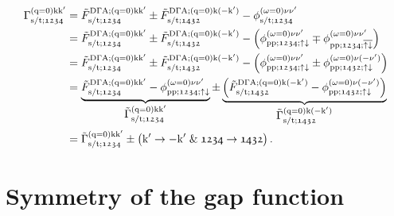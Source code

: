 \documentclass[main.tex]{subfiles}
\begin{document}
\begin{align}
\begin{split}
	\Gamma_{\text{s}/\text{t};\mathfrak{1234}}^{(\text{q}=0)\text{k}\text{k}'}&=\tilde{F}_{\text{s}/\text{t};\mathfrak{1234}}^{\text{D}\Gamma\text{A};(\text{q}=0)\text{k}\text{k}'}\pm \tilde{F}_{\text{s}/\text{t};\mathfrak{1432}}^{\text{D}\Gamma\text{A};(\text{q}=0)\text{k}(-\text{k}')}-\phi_{\text{s}/\text{t};\mathfrak{1234}}^{(\omega=0)\nu\nu'}\\
	&=\tilde{F}_{\text{s}/\text{t};\mathfrak{1234}}^{\text{D}\Gamma\text{A};(\text{q}=0)\text{k}\text{k}'}\pm \tilde{F}_{\text{s}/\text{t};\mathfrak{1432}}^{\text{D}\Gamma\text{A};(\text{q}=0)\text{k}(-\text{k}')}-\left (\phi_{\text{pp};\mathfrak{1234};\uparrow\downarrow}^{(\omega=0)\nu\nu'}\mp \phi_{\text{pp};\mathfrak{1234};\overline{\uparrow\downarrow}}^{(\omega=0)\nu\nu'}\right )\\
	&=\tilde{F}_{\text{s}/\text{t};\mathfrak{1234}}^{\text{D}\Gamma\text{A};(\text{q}=0)\text{k}\text{k}'}\pm \tilde{F}_{\text{s}/\text{t};\mathfrak{1432}}^{\text{D}\Gamma\text{A};(\text{q}=0)\text{k}(-\text{k}')}-\left (\phi_{\text{pp};\mathfrak{1234};\uparrow\downarrow}^{(\omega=0)\nu\nu'}\pm \phi_{\text{pp};\mathfrak{1432};\uparrow\downarrow}^{(\omega=0)\nu(-\nu')}\right )\\
	&=\underbrace{\tilde{F}_{\text{s}/\text{t};\mathfrak{1234}}^{\text{D}\Gamma\text{A};(\text{q}=0)\text{k}\text{k}'}-\phi_{\text{pp};\mathfrak{1234};\uparrow\downarrow}^{(\omega=0)\nu\nu'}}_{\textstyle\tilde{\Gamma}_{\text{s}/\text{t};\mathfrak{1234}}^{(\text{q}=0)\text{k}\text{k}'}}\pm \underbrace{\left (\tilde{F}_{\text{s}/\text{t};\mathfrak{1432}}^{\text{D}\Gamma\text{A};(\text{q}=0)\text{k}(-\text{k}')}- \phi_{\text{pp};\mathfrak{1432};\uparrow\downarrow}^{(\omega=0)\nu(-\nu')}\right )}_{\textstyle\tilde{\Gamma}_{\text{s}/\text{t};\mathfrak{1432}}^{(\text{q}=0)\text{k}(-\text{k}')}}\\
	&=\tilde{\Gamma}_{\text{s}/\text{t};\mathfrak{1234}}^{(\text{q}=0)\text{k}\text{k}'}\pm \left (\text{k}'\rightarrow -\text{k}'\;\&\; \mathfrak{1234}\rightarrow\mathfrak{1432}\right ).
\end{split}
\end{align}

\newpage

\section{Symmetry of the gap function}
\end{document}
